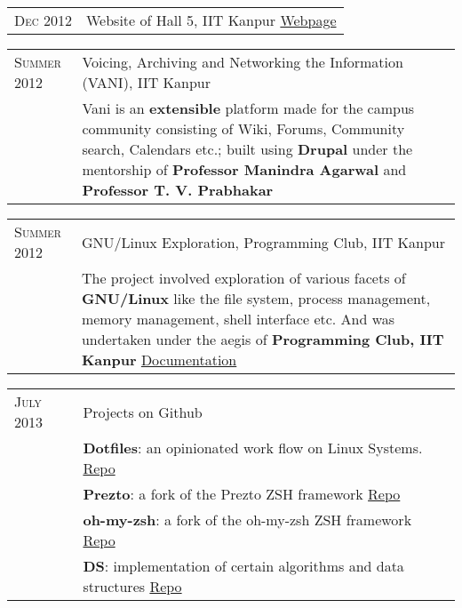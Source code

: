 \documentclass[a4paper,10pt]{article} %
\begin{document}
\begin{tabular}{p{2.2cm}|p{14cm}}
    \textsc{Dec 2012} & Website of Hall 5, IIT Kanpur \footnotesize{\href{http://www.iitk.ac.in/hall5} {Webpage}} \\
\end{tabular}

\begin{tabular}{p{2.2cm}|p{14cm}}
    \textsc{Summer 2012} & Voicing, Archiving and Networking the Information \textsc{(VANI)}, IIT Kanpur\\
                           & \footnotesize{Vani is an \textbf{extensible} platform
                              made for the campus community consisting of Wiki, Forums,
                              Community search, Calendars etc.; built using \textbf{Drupal}
                              under the mentorship of \textbf{Professor Manindra Agarwal} and
                              \textbf{Professor T. V. Prabhakar} } \\
\end{tabular}

\begin{tabular}{p{2.2cm}|p{14cm}}
    \textsc{Summer 2012} & GNU/Linux Exploration, Programming Club, IIT Kanpur\\
                           & \footnotesize{ The project involved exploration of various facets of
                             \textbf{GNU/Linux} like the file system, process management,
                             memory management, shell interface etc. And was
                             undertaken under the aegis of \textbf{Programming Club, IIT Kanpur}
                             \href{https://docs.google.com/document/d/1ZHO9w36aoq3oaZBR4Um1AOmDfiTDAEgM6baQAu3icw4/edit?usp=sharing}
                             {Documentation} } \\
\end{tabular}

\begin{tabular}{p{2.2cm}|p{14cm}}
    \textsc{July 2013} & Projects on Github \\
                       & \footnotesize{\textbf{Dotfiles}: an opinionated work flow on Linux Systems.
                          \href{https://github.com/srijanshetty/dotfiles} {Repo} } \\
                       & \footnotesize{\textbf{Prezto}: a fork of the Prezto ZSH framework
                          \href{https://github.com/srijanshetty/prezto} {Repo}} \\
                       & \footnotesize {\textbf{oh-my-zsh}: a fork of the oh-my-zsh ZSH framework
                          \href{https://github.com/srijanshetty/oh-my-zsh} {Repo} } \\
                       & \footnotesize{\textbf{DS}: implementation of certain algorithms and data structures
                          \href{https://github.com/srijanshetty/DS} {Repo}} \\
\end{tabular}
\end{document}
